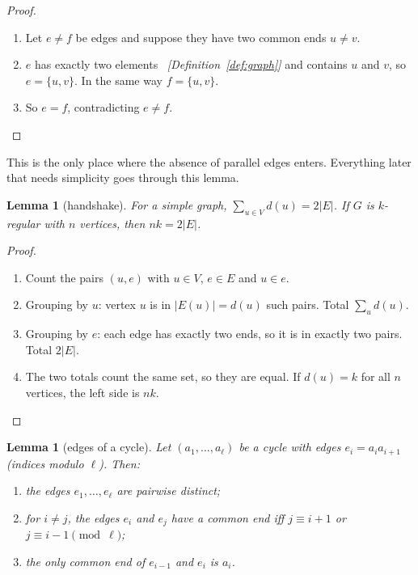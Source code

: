 \documentclass[11pt]{article}
\theoremstyle{plain}
\newtheorem{lemma}[theorem]{Lemma}
\theoremstyle{definition}
\theoremstyle{remark}
\newcommand{\st}[1]{E(#1)}
\newcommand{\why}[1]{\unskip\ \textit{[#1]}}
\newenvironment{steps}{\begin{enumerate}[label=(\arabic*),leftmargin=2.2em,itemsep=0.35em]}{\end{enumerate}}
\begin{document}
\begin{proof}
\begin{steps}
  \item Let $e\ne f$ be edges and suppose they have two common ends $u\ne v$.
  \item $e$ has exactly two elements \why{Definition~\ref{def:graph}} and contains $u$ and $v$,
    so $e=\{u,v\}$. In the same way $f=\{u,v\}$.
  \item So $e=f$, contradicting $e\ne f$. \qedhere
\end{steps}
\end{proof}

This is the only place where the absence of parallel edges enters. Everything later that needs
simplicity goes through this lemma.

\begin{lemma}[handshake]\label{lem:handshake}
For a simple graph, $\sum_{u\in V}d(u)=2|E|$. If $G$ is $k$-regular with $n$ vertices, then
$nk=2|E|$.
\end{lemma}

\begin{proof}
\begin{steps}
  \item Count the pairs $(u,e)$ with $u\in V$, $e\in E$ and $u\in e$.
  \item Grouping by $u$: vertex $u$ is in $|\st{u}|=d(u)$ such pairs. Total $\sum_u d(u)$.
  \item Grouping by $e$: each edge has exactly two ends, so it is in exactly two pairs. Total
    $2|E|$.
  \item The two totals count the same set, so they are equal. If $d(u)=k$ for all $n$ vertices,
    the left side is $nk$. \qedhere
\end{steps}
\end{proof}

\begin{lemma}[edges of a cycle]\label{lem:cycle-edges}
Let $(a_1,\dots,a_\ell)$ be a cycle with edges $e_i=a_ia_{i+1}$ (indices modulo $\ell$). Then:
\begin{enumerate}[label=(\alph*)]
  \item the edges $e_1,\dots,e_\ell$ are pairwise distinct;
  \item for $i\ne j$, the edges $e_i$ and $e_j$ have a common end iff $j\equiv i+1$ or
    $j\equiv i-1\pmod\ell$;
  \item the only common end of $e_{i-1}$ and $e_i$ is $a_i$.
\end{enumerate}
\end{lemma}
\end{document}
